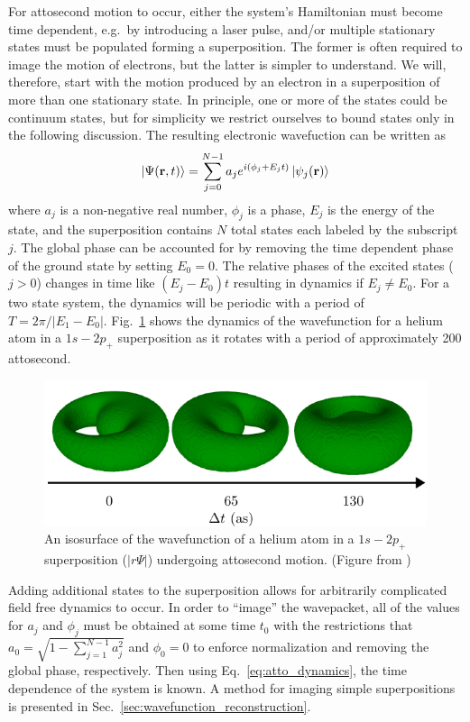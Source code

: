 For attosecond motion to occur, either the system's Hamiltonian must become time dependent, e.g.\ by introducing a laser pulse, and/or multiple stationary states must be populated forming a superposition. The former is often required to image the motion of electrons, but the latter is simpler to understand. We will, therefore, start with the motion produced by an electron in a superposition of more than one stationary state. In principle, one or more of the states could be continuum states, but for simplicity we restrict ourselves to bound states only in the following discussion. The resulting electronic wavefuction can be written as
\begin{equation}
\label{eq:atto_dynamics}
    \ket{\Psi(\mathbf{r},t)} = \sum_{j=0}^{N-1} a_j e^{i(\phi_j +E_jt)}\ket{\psi_j(\mathbf{r})}
\end{equation}
where $a_j$ is a non-negative real number, $\phi_j$ is a phase, $E_j$ is the energy of the state, and the superposition contains $N$ total states each labeled by the subscript $j$. The global phase can be accounted for by removing the time dependent phase of the ground state by setting $E_0=0$. The relative phases of the excited states ($j>0$) changes in time like $(E_j-E_0)t$ resulting in dynamics if $E_j\ne E_0$. For a two state system, the dynamics will be periodic with a period of $T=2\pi/|E_1- E_0|$. Fig.~\ref{fig:he_dynamics} shows the dynamics of the wavefunction for a helium atom in a $1s-2p_+$ superposition as it rotates with a period of approximately 200 attosecond.

\begin{figure}[!ht]
\centering
\includegraphics[width=\columnwidth]{figs/background/dynamics.pdf}
\caption{\label{fig:he_dynamics} An isosurface of the wavefunction of a helium atom in a $1s-2p_+$ superposition ($|r\Psi|$) undergoing attosecond motion. (Figure from \cite{venzke2021_wave})
}
\end{figure}

Adding additional states to the superposition allows for arbitrarily complicated field free dynamics to occur. In order to ``image'' the wavepacket, all of the values for $a_j$ and $\phi_j$ must be obtained at some time $t_0$ with the restrictions that $a_0 = \sqrt{1-\sum_{j=1}^{N-1} a_j^2}$ and $\phi_0=0$ to enforce normalization and removing the global phase, respectively. Then using Eq.~\ref{eq:atto_dynamics}, the time dependence of the system is known. A method for imaging simple superpositions is presented in Sec.~\ref{sec:wavefunction_reconstruction}.

